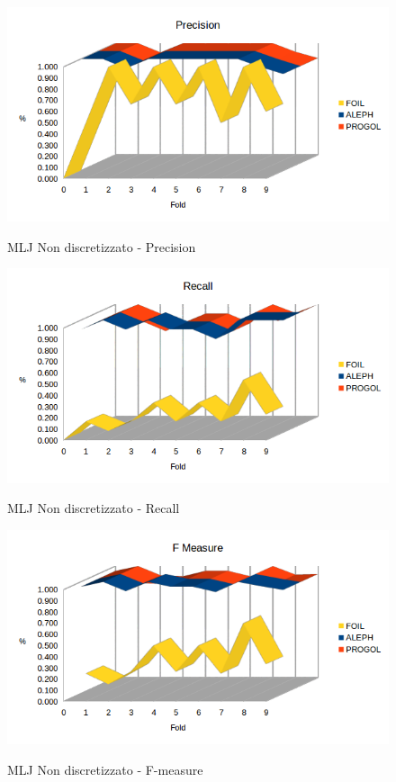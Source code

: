 \begin{figure}[H]
	\includegraphics[width=1.1\textwidth]{img/datasetGraph/mlj/nodiscr/precision.png}
	\label{mljnodiscr-Precision}
	\caption{MLJ Non discretizzato - Precision}
\end{figure}

\begin{figure}[H]
	\includegraphics[width=1.1\textwidth]{img/datasetGraph/mlj/nodiscr/recall.png}
	\label{mljnodiscr-Recall}
	\caption{MLJ Non discretizzato - Recall}
\end{figure}

\begin{figure}[H]
	\includegraphics[width=1.1\textwidth]{img/datasetGraph/mlj/nodiscr/fm.png}
	\label{mljnodiscr-F-measure}
	\caption{MLJ Non discretizzato - F-measure}
\end{figure}

